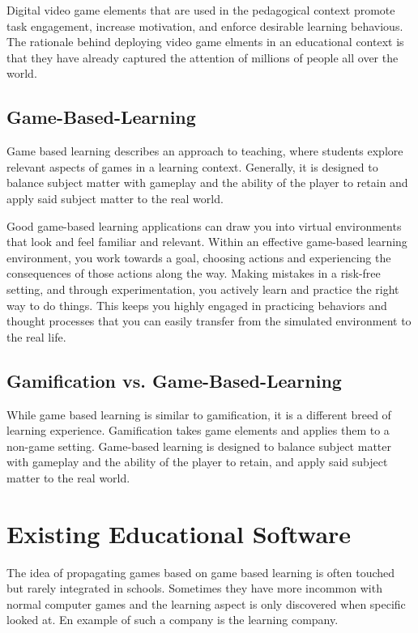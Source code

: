 Digital video game elements that are used in the pedagogical context promote task engagement, increase motivation,
and enforce desirable learning behavious.
The rationale behind deploying video game elments in an educational context is that they have already captured the
attention of millions of people all over the world.

\subsection{Game-Based-Learning}\label{subsec:game-based-learning}
Game based learning describes an approach to teaching,
where students explore relevant aspects of games in a learning context.
Generally, it is designed to balance subject matter with gameplay and the ability of the player
to retain and apply said subject matter to the real world.

Good game-based learning applications can draw you into virtual environments that look and feel familiar and relevant.
Within an effective game-based learning environment, you work towards a goal,
choosing actions and experiencing the consequences of those actions along the way.
Making mistakes in a risk-free setting, and through experimentation,
you actively learn and practice the right way to do things.
This keeps you highly engaged in practicing behaviors and thought processes that you can easily transfer from the
simulated environment to the real life\cite{gal}.

\subsection{Gamification vs. Game-Based-Learning}\label{subsec:gamification-vs.-game-based-learning}
While game based learning is similar to gamification, it is a different breed of learning experience.
Gamification takes game elements and applies them to a non-game setting.
Game-based learning is designed to balance subject matter with gameplay and the ability of the player to retain,
and apply said subject matter to the real world.

\section{Existing Educational Software}
The idea of propagating games based on game based learning is often touched but rarely integrated in schools.
Sometimes they have more incommon with normal computer games and the learning aspect is only discovered when specific looked at.
En example of such a company is the learning company\cite{tlc}.

